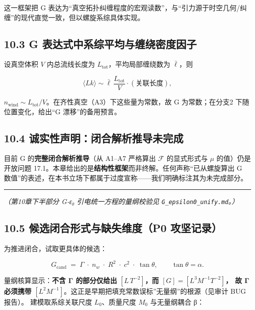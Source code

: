 这一框架把 G
表达为``真空拓扑纠缠程度的宏观读数''，与``引力源于时空几何/纠缠''的现代直觉一致，但以螺旋系综具体实现。

\subsection{10.3 G
表达式中系综平均与缠绕密度因子}\label{g-ux8868ux8fbeux5f0fux4e2dux7cfbux7efcux5e73ux5747ux4e0eux7f20ux7ed5ux5bc6ux5ea6ux56e0ux5b50}

设真空体积 \(V\) 内总流线长度为 \(L_{\mathrm{tot}}\)，平均局部缠绕数为
\(\bar{\ell}\)，则

\[
\langle Lk\rangle \sim \bar{\ell}\,\frac{L_{\mathrm{tot}}}{V}\cdot (\text{关联长度}),
\]

\(n_{\mathrm{wind}}\sim L_{\mathrm{tot}}/V\)。在齐性真空（A3）下这些量为常数，故
G 为常数；在分支2 下随位置变化，给出``G 漂移''的备用预言。

\subsection{10.4
诚实性声明：闭合解析推导未完成}\label{ux8bdaux5b9eux6027ux58f0ux660eux95edux5408ux89e3ux6790ux63a8ux5bfcux672aux5b8cux6210}

目前 G 的\textbf{完整闭合解析推导}（从 A1--A7 严格算出 \(\mathcal{F}\)
的显式形式与 \(\mu\) 的值）仍是开放问题
17.1。本章给出的是\textbf{结构性框架}而非终解。任何声称``已从螺旋算出 G
数值''的表述，在本书立场下都属于过度宣称------我们明确标注其为未完成部分。

\begin{center}\rule{0.5\linewidth}{0.5pt}\end{center}

\emph{（第10章下半部分 G‑ε₀ 引电统一方程的量纲校验见
\texttt{G\_epsilon0\_unify.md}。）}

\subsection{10.5 候选闭合形式与缺失维度（P0
攻坚记录）}\label{ux5019ux9009ux95edux5408ux5f62ux5f0fux4e0eux7f3aux5931ux7ef4ux5ea6p0-ux653bux575aux8bb0ux5f55}

为推进闭合，试取更具体的候选：

\[
G_{\text{cand}} \;=\; \Gamma \;\cdot\; n_w \;\cdot\; R^{2} \;\cdot\; c^{2} \;\cdot\; \tan\theta,
\qquad \tan\theta=\alpha .
\]

量纲核算显示：\textbf{不含 Γ 的部分仅给出 \([L\,T^{-2}]\)，而
\([G]=[L^3 M^{-1} T^{-2}]\)， 故 Γ 必须携带
\([L^2 M^{-1}]\)}。这正是早期把填充常数误标''无量纲''的根源（见审计 BUG
报告）。 建模取系综关联尺度 \(L_0\)、质量尺度 \(M_0\) 与无量纲耦合 β：


